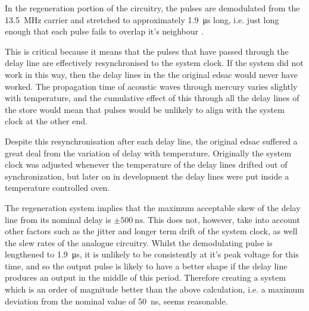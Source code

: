 In the regeneration portion of the circuitry, the pulses are demodulated from the \SI{13.5}{\mega\hertz} carrier and stretched to approximately \SI{1.9}{\micro\second} long, i.e. just long enough that each pulse fails to overlap it's neighbour \cite[p.212]{wilkes1948}.

This is critical because it means that the pulses that have passed through the delay line are effectively resynchronised to the system clock. If the system did not work in this way, then the delay lines in the the original \gls{edsac} would never have worked. The propagation time of acoustic waves through mercury varies slightly with temperature, and the cumulative effect of this through all the delay lines of the store would mean that pulses would be unlikely to align with the system clock at the other end.

Despite this resynchronisation after each delay line, the original \gls{edsac} suffered a great deal from the variation of delay with temperature. Originally the system clock was adjusted whenever the temperature of the delay lines drifted out of synchronization, but later on in development the delay lines were put inside a temperature controlled oven.

\newcommand{\maxJitterPlusSkewNs}{50} %

The regeneration system implies that the maximum acceptable skew of the delay line from its nominal delay is $\pm\SI{500}{\nano\second}$. This does not, however, take into account other factors such as the jitter and longer term drift of the system clock, as well the slew rates of the analogue circuitry. Whilst the demodulating pulse is lengthened to \SI{1.9}{\micro\second}, it is unlikely to be consistently at it's peak voltage for this time, and so the output pulse is likely to have a better shape if the delay line produces an output in the middle of this period. Therefore creating a system which is an order of magnitude better than the above calculation, i.e. a maximum deviation from the nominal value of \SI{\maxJitterPlusSkewNs}{\nano\second}, seems reasonable.

